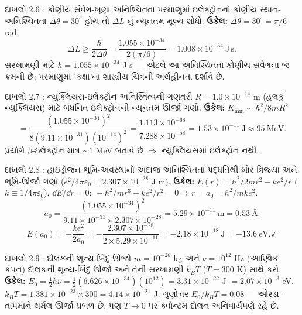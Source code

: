 \begin{dahlo}{દાખલો 2.6 : કોણીય સંવેગ-ખૂણા અનિશ્ચિતતા}
પરમાણુમાં ઇલેક્ટ્રોનનો કોણીય સ્થાન-અનિશ્ચિતતા $\Delta\theta=30^\circ$ હોય તો $\Delta L$ નું ન્યૂનતમ મૂલ્ય શોધો.
\tcblower
\textbf{ઉકેલ:} $\Delta\theta=30^\circ=\pi/6$ rad.
\[
\Delta L\ge\frac{\hbar}{2\Delta\theta}=\frac{1.055\times10^{-34}}{2(\pi/6)}=1.008\times10^{-34}\ \mathrm{J\,s}.
\]
સરખામણી માટે $\hbar=1.055\times10^{-34}$ J s — એટલે આ અનિશ્ચિતતા કોણીય સંવેગના જ ક્રમની છે; પરમાણુમાં 'કક્ષા'ના શાસ્ત્રીય ચિત્રની અર્થહીનતા દર્શાવે છે.
\end{dahlo}

\begin{dahlo}{દાખલો 2.7 : ન્યુક્લિયસ-ઇલેક્ટ્રોન અનિસ્તિત્વની ગણતરી}
$R=1.0\times10^{-14}$ m (હલકું ન્યુક્લિયસ) માટે બંધનિત ઇલેક્ટ્રોનની ન્યૂનતમ ઊર્જા ગણો.
\tcblower
\textbf{ઉકેલ:} $K_{\min}\sim\hbar^2/8mR^2$
\[
=\frac{(1.055\times10^{-34})^{2}}{8(9.11\times10^{-31})(10^{-14})^{2}}
=\frac{1.113\times10^{-68}}{7.288\times10^{-58}}=1.53\times10^{-11}\ \mathrm{J}\approx95\ \mathrm{MeV}.
\]
પ્રયોગે $\beta$-ઇલેક્ટ્રોન માત્ર $\sim1$ MeV બતાવે છે $\Rightarrow$ ન્યુક્લિયસમાં ઇલેક્ટ્રોન નથી.
\end{dahlo}

\begin{dahlo}{દાખલો 2.8 : હાઇડ્રોજન ભૂમિ-અવસ્થાનો અંદાજ}
અનિશ્ચિતતા પદ્ધતિથી બોર ત્રિજ્યા અને ભૂમિ-ઊર્જા ગણો ($e^2/4\pi\varepsilon_0=2.307\times10^{-28}$ J m).
\tcblower
\textbf{ઉકેલ:} $E(r)=\hbar^{2}/2mr^{2}-ke^{2}/r$ ($k\equiv1/4\pi\varepsilon_0$).
$\dd E/\dd r=0:\ -\hbar^{2}/mr^{3}+ke^{2}/r^{2}=0\Rightarrow r=a_0=\hbar^{2}/mke^{2}$.
\[
a_0=\frac{(1.055\times10^{-34})^{2}}{9.11\times10^{-31}\times2.307\times10^{-28}}=5.29\times10^{-11}\ \mathrm{m}=0.53\ \text{Å}.
\]
\[
E(a_0)=-\frac{ke^{2}}{2a_0}=-\frac{2.307\times10^{-28}}{2\times5.29\times10^{-11}}=-2.18\times10^{-18}\ \mathrm{J}=-13.6\ \mathrm{eV}. \checkmark
\]
\end{dahlo}

\begin{dahlo}{દાખલો 2.9 : દોલકની શૂન્ય-બિંદુ ઊર્જા}
$m=10^{-26}$ kg અને $\nu=10^{12}$ Hz (આણ્વિક કંપન) દોલકની શૂન્ય-બિંદુ ઊર્જા અને તેની સરખામણી $k_BT$ ($T=300$ K) સાથે કરો.
\tcblower
\textbf{ઉકેલ:} $E_0=\tfrac12h\nu=\tfrac12(6.626\times10^{-34})(10^{12})=3.31\times10^{-22}$ J $=2.07\times10^{-3}$ eV.
$k_B T=1.381\times10^{-23}\times300=4.14\times10^{-21}$ J.
ગુણોત્તર $E_0/k_BT=0.08$ — ઓરડા-તાપમાને થર્મલ ઊર્જા પ્રબળ છે, પણ $T\to0$ પર ક્વોન્ટમ દોલન અનિવાર્યપણે રહે છે.
\end{dahlo}

